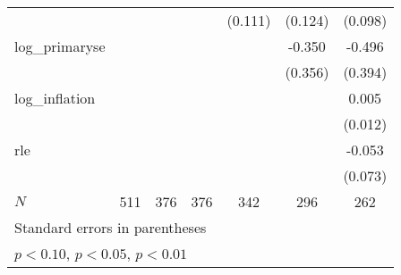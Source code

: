 {\begin{tabular}{l*{6}{c}}
            &                     &                     &                     &     (0.111)         &     (0.124)         &     (0.098)         \\
\addlinespace
log\_primaryse&                     &                     &                     &                     &      -0.350         &      -0.496         \\
            &                     &                     &                     &                     &     (0.356)         &     (0.394)         \\
\addlinespace
log\_inflation&                     &                     &                     &                     &                     &       0.005         \\
            &                     &                     &                     &                     &                     &     (0.012)         \\
\addlinespace
rle         &                     &                     &                     &                     &                     &      -0.053         \\
            &                     &                     &                     &                     &                     &     (0.073)         \\
\midrule
\(N\)       &         511         &         376         &         376         &         342         &         296         &         262         \\
\bottomrule
\multicolumn{7}{l}{\footnotesize Standard errors in parentheses}\\
\multicolumn{7}{l}{\footnotesize \sym{*} \(p<0.10\), \sym{**} \(p<0.05\), \sym{***} \(p<0.01\)}\\
\end{tabular}
}
